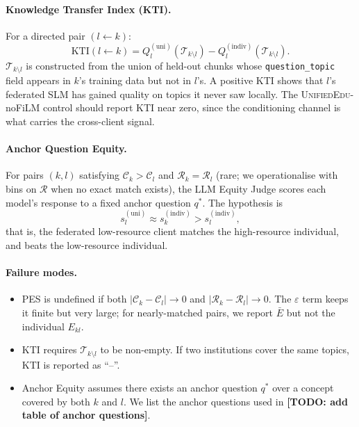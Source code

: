 \documentclass[11pt]{article}
\theoremstyle{plain}
\theoremstyle{definition}
\theoremstyle{remark}
\newcommand{\red}[1]{\textcolor{myred}{\textbf{#1}}}
\newcommand{\UniEdu}{\textsc{UnifiedEdu}}
\newcommand{\indiv}{\text{indiv}}
\newcommand{\uni}{\text{uni}}
\begin{document}
\paragraph{Knowledge Transfer Index (KTI).}
For a directed pair $(l \leftarrow k)$:
\begin{equation}
  \mathrm{KTI}(l \leftarrow k) =
  Q_l^{(\uni)}(\mathcal{T}_{k\setminus l}) -
  Q_l^{(\indiv)}(\mathcal{T}_{k\setminus l}).
  \label{eq:kti}
\end{equation}
$\mathcal{T}_{k\setminus l}$ is constructed from
the union of held-out chunks whose
\texttt{question\_topic} field appears in $k$'s
training data but not in $l$'s. A positive KTI shows
that $l$'s federated SLM has gained quality on
topics it never saw locally. The
\UniEdu{}-noFiLM control should report KTI near
zero, since the conditioning channel is what carries
the cross-client signal.

\paragraph{Anchor Question Equity.}
For pairs $(k, l)$ satisfying $\mathcal{C}_k >
\mathcal{C}_l$ and $\mathcal{R}_k = \mathcal{R}_l$
(rare; we operationalise with bins on $\mathcal{R}$
when no exact match exists), the LLM Equity Judge
scores each model's response to a fixed anchor
question $q^*$. The hypothesis is
\begin{equation}
  s_l^{(\uni)} \approx s_k^{(\indiv)} > s_l^{(\indiv)},
  \label{eq:anchor_hypothesis}
\end{equation}
that is, the federated low-resource client matches
the high-resource individual, and beats the
low-resource individual.

\paragraph{Failure modes.}
\begin{itemize}[leftmargin=1.5em, itemsep=2pt]
  \item PES is undefined if both
  $|\mathcal{C}_k - \mathcal{C}_l| \to 0$ and
  $|\mathcal{R}_k - \mathcal{R}_l| \to 0$. The
  $\varepsilon$ term keeps it finite but very large;
  for nearly-matched pairs, we report $\bar{E}$ but
  not the individual $E_{kl}$.
  \item KTI requires $\mathcal{T}_{k\setminus l}$ to
  be non-empty. If two institutions cover the same
  topics, KTI is reported as ``--''.
  \item Anchor Equity assumes there exists an anchor
  question $q^*$ over a concept covered by both $k$
  and $l$. We list the anchor questions used in
  \red{[TODO: add table of anchor questions]}.
\end{itemize}
\end{document}
